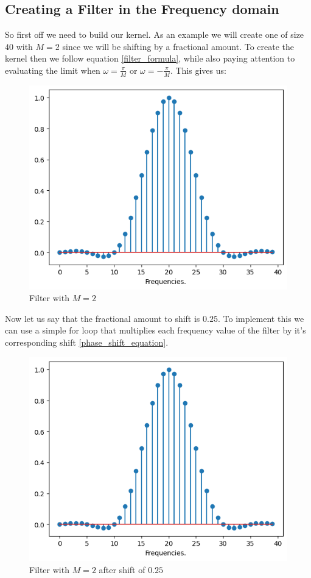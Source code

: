 \documentclass[]{usiinfbachelorproject}
\begin{document}
		\subsection{Creating a Filter in the Frequency domain}
		So first off we need to build our kernel. As an example we will create one of size $40$ with $M=2$ since we will be shifting by a fractional amount. To create the kernel then we follow equation \ref{filter_formula}, while also paying attention to evaluating the limit when $\omega=\frac{\pi}{M}$ or $\omega=-\frac{\pi}{M}$. This gives us:
		\begin{figure}[h]
			\centering
			\includegraphics[width=0.4\columnwidth]{images/filter_m_2.png}
			\caption{Filter with $M=2$}
			\label{original_filter}
		\end{figure}
		
		
		
		Now let us say that the fractional amount to shift is $0.25$. To implement this we can use a simple for loop that multiplies each frequency value of the filter by it's corresponding shift \ref{phase_shift_equation}.
		\begin{figure}[h]
			\centering
			\includegraphics[width=0.4\columnwidth]{images/filter_m_2_25_shift.png}
			\caption{Filter with $M=2$ after shift of $0.25$}
			\label{shifted_filter}
		\end{figure}
		
\end{document}
